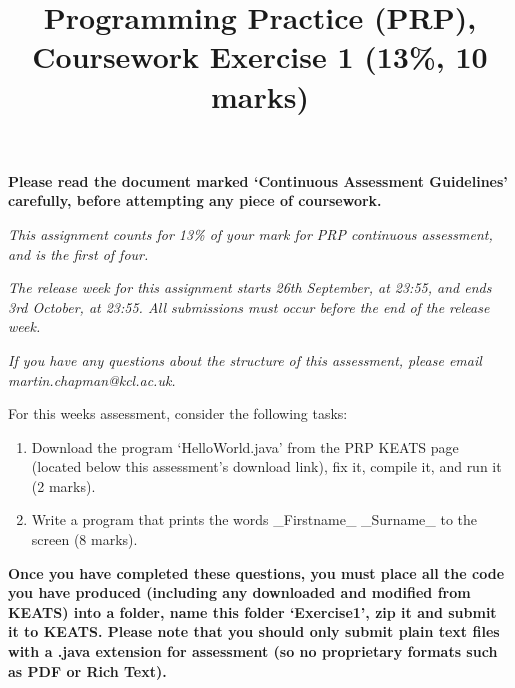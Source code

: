 \documentclass[11pt]{article}
\title{Programming Practice (PRP), Coursework Exercise 1 (13\%, 10 marks)}
\date{}                                           %
\begin{document}
\maketitle

\textbf{Please read the document marked `Continuous Assessment Guidelines' carefully, before attempting any piece of coursework.}

\emph{This assignment counts for 13\% of your mark for PRP continuous assessment, and is the first of four.}

\emph{The release week for this assignment starts 26th September, at 23:55, and ends 3rd October, at 23:55. All submissions must occur before the end of the release week.}

\emph{If you have any questions about the structure of this assessment, please email \\ martin.chapman@kcl.ac.uk.}

For this weeks assessment, consider the following tasks:

\begin{enumerate}

	\item Download the program `HelloWorld.java' from the PRP KEATS page (located below this assessment's download link), fix it, compile it, and run it (2 marks).
	
	\item Write a program that prints the words _Firstname_ _Surname_ to the screen (8 marks).

\end{enumerate}

\textbf{Once you have completed these questions, you must place all the code you have produced (including any downloaded and modified from KEATS) into a folder, name this folder `Exercise1', zip it and submit it to KEATS. Please note that you should only submit plain text files with a .java extension for assessment (so no proprietary formats such as PDF or Rich Text).}
\end{document}
